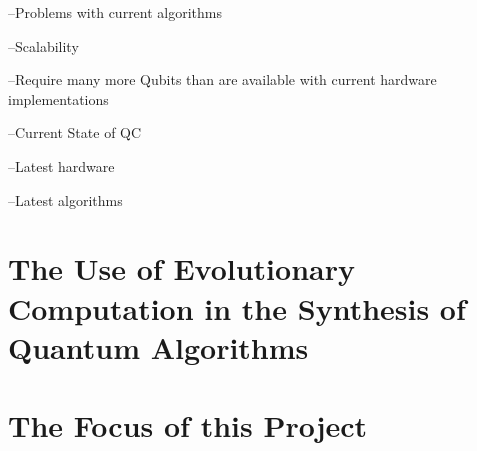 \documentclass[authoryearcitations]{UoYCSproject}
\begin{document}
--Problems with current algorithms

	--Scalability
	
	--Require many more Qubits than are available with current hardware implementations


--Current State of QC
	
	--Latest hardware
	
	--Latest algorithms

\section{The Use of Evolutionary Computation in the Synthesis of Quantum Algorithms}

\section{The Focus of this Project}


\end{document}
